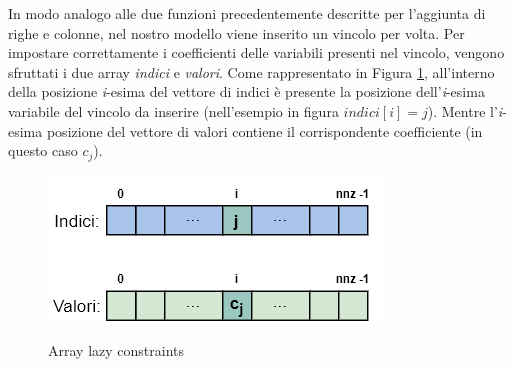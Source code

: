 In modo analogo alle due funzioni precedentemente descritte per l'aggiunta di righe e colonne, nel nostro modello viene inserito un vincolo per volta. Per impostare correttamente i coefficienti delle variabili presenti nel vincolo, vengono sfruttati i due array \textit{indici} e \textit{valori}. Come rappresentato in Figura \ref{lazy_constraints}, all'interno della posizione \textit{i}-esima del vettore di indici è presente la posizione dell'\textit{i}-esima variabile del vincolo da inserire (nell'esempio in figura $indici[i]=j$). Mentre l'\textit{i}-esima posizione del vettore di valori contiene il corrispondente  coefficiente (in questo caso $c_j$).
\begin{figure}[h] 
\begin{center} 
  \includegraphics[scale=0.5]{Images/lazy_constraints}\\ 
  \caption{\footnotesize{Array lazy constraints}}
  \label{lazy_constraints} 
\end{center} 
\end{figure}

